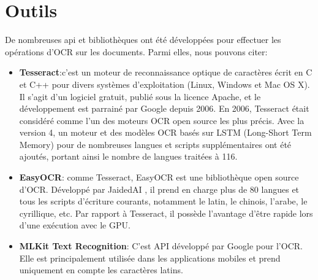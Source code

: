 \section{Outils}
De nombreuses \acrshort{api} et bibliothèques ont été développées pour effectuer les opérations d’OCR sur les documents. Parmi elles, nous pouvons citer:

\begin{itemize}
    \item \textbf{Tesseract}:c’est un moteur de reconnaissance optique de caractères écrit en C et C++ pour divers systèmes d'exploitation (Linux, Windows et Mac OS X). Il s'agit d'un logiciel gratuit, publié sous la licence Apache, et le développement est parrainé par Google depuis 2006. En 2006, Tesseract était considéré comme l'un des moteurs OCR open source les plus précis. Avec la version 4, un moteur et des modèles OCR basés sur LSTM (Long-Short Term Memory) pour de nombreuses langues et scripts supplémentaires ont été ajoutés, portant ainsi le nombre de langues traitées à 116.
    \item \textbf{EasyOCR}: comme Tesseract, EasyOCR est une bibliothèque  open source d’OCR. Développé par JaidedAI , il prend en charge plus de 80 langues et tous les scripts d'écriture courants, notamment le latin, le chinois, l'arabe, le cyrillique, etc. Par rapport à Tesseract, il possède l’avantage d’être rapide lors d’une exécution avec le GPU.
    \item \textbf{MLKit Text Recognition}: 
    C’est API développé par Google pour l’OCR. Elle est principalement utilisée dans les applications mobiles et prend uniquement en compte les caractères latins.
    
\end{itemize}
